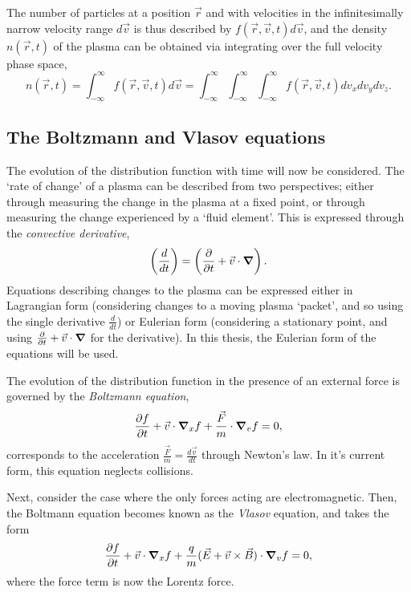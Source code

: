 The number of particles at a position $\vec{r}$ and with velocities in the infinitesimally narrow velocity range $d\vec{v}$ is thus described by $f(\vec{r}, \vec{v}, t) d\vec{v}$, and the density $n(\vec{r},t)$ of the plasma can be obtained via integrating over the full velocity phase space,
\begin{equation} n(\vec{r}, t) = \int^{\infty}_{-\infty} f(\vec{r}, \vec{v}, t) d\vec{v}  = \int^{\infty}_{-\infty} \int^{\infty}_{-\infty} \int^{\infty}_{-\infty} f(\vec{r}, \vec{v}, t) dv_x dv_y dv_z. \end{equation}


\subsection{The Boltzmann and Vlasov equations}

The evolution of the distribution function with time will now be considered. The `rate of change' of a plasma can be described from two perspectives; either through measuring the change in the plasma at a fixed point, or through measuring the change experienced by a `fluid element'. This is expressed through the \textit{convective derivative}, 
\begin{equation} \left(\frac{d}{dt}\right) = \left(\frac{\partial}{\partial t} + \vec{v} \cdot \grad\right). \end{equation}
Equations describing changes to the plasma can be expressed either in Lagrangian form (considering changes to a moving plasma `packet', and so using the single derivative $\frac{d}{dt}$) or Eulerian form (considering a stationary point, and using $\frac{\partial}{\partial t} + \vec{v} \cdot \grad$ for the derivative). In this thesis, the Eulerian form of the equations will be used.

The evolution of the distribution function in the presence of an external force is governed by the \textit{Boltzmann equation},
\begin{equation} \frac{\partial f}{\partial t} + \vec{v}\cdot \grad_x f + \frac{\vec{F}}{m} \cdot \grad_v f = 0, \end{equation}
corresponds to the acceleration $\frac{\vec{F}}{m} = \frac{d\vec{v}}{dt}$ through Newton's law. In it's current form, this equation neglects collisions.

Next, consider the case where the only forces acting are electromagnetic. Then, the Boltmann equation becomes known as the \textit{Vlasov} equation, and takes the form
\begin{equation} \frac{\partial f}{\partial t} + \vec{v}\cdot \grad_x f + \frac{q}{m}(\vec{E} + \vec{v}\times\vec{B}) \cdot \grad_v f = 0, \end{equation}
where the force term is now the Lorentz force.

